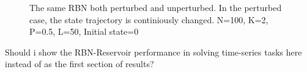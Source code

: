 \begin{figure}
  \caption{The same RBN both perturbed and unperturbed. In the perturbed case, the state trajectory is continiously changed. N=100, K=2, P=0.5, L=50, Initial state=0}
\end{figure}

Should i show the RBN-Reservoir performance in solving time-series tasks here instead of as the first section of results?
